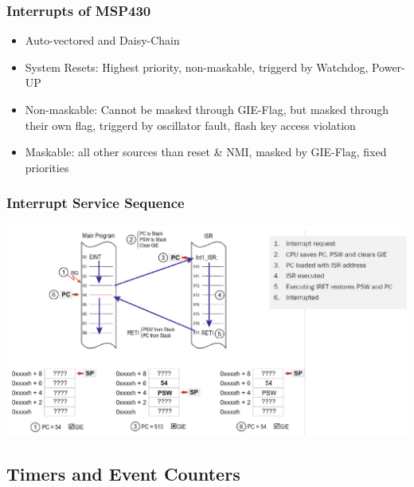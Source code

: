\subsubsection{Interrupts of MSP430}
\begin{itemize}
	\item Auto-vectored and Daisy-Chain
	\item System Resets: Highest priority, non-maskable, triggerd by Watchdog, Power-UP
	\item Non-maskable: Cannot be masked through GIE-Flag, but masked through their own flag, triggerd by oscillator fault, flash key access violation
	\item Maskable: all other sources than reset \& NMI, masked by GIE-Flag, fixed priorities
\end{itemize}
\subsubsection{Interrupt Service Sequence}
\includegraphics[width=16cm]{images/iss.png}

\subsection{Timers and Event Counters}
